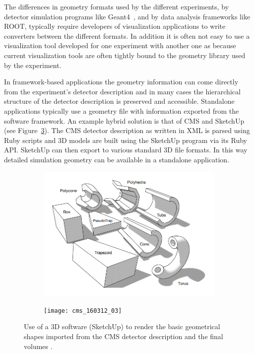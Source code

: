 \documentclass[12pt,a4paper]{article}
\begin{document}
The differences in geometry formats used by the different experiments, by detector simulation programs like Geant4~\cite{Geant4},
and by data analysis frameworks like ROOT, typically require developers of visualization applications to write converters
between the different formats. In addition it is often not easy to use a visualization tool developed for one experiment with another one as
because current visualization tools are often tightly bound to the geometry library used by the experiment.

In framework-based applications the geometry information can come directly from the experiment's detector description and in
 many cases the hierarchical structure of the detector description is preserved and accessible. Standalone applications
typically use a geometry file with information exported from the software framework. An example hybrid solution is that
of CMS and SketchUp~\cite{CMSSketchUp} (see Figure~\ref{fig:cms-sketchup}).
The CMS detector description as written in XML is parsed using Ruby scripts and 3D models are built using the
SketchUp program via its Ruby API. SketchUp can then export to various standard 3D file formats. In this way
detailed simulation geometry can be available in a standalone application.

\begin{figure}
	\centering
	\begin{subfigure}[b]{0.475\textwidth}
		\centering
		\includegraphics[width=\textwidth]{cms-sketchup-shapes}
		\caption[Converting the CMS detector geometry data to 3D meshes]{{\small}}
		\label{fig:ed-sketchup-a}
	\end{subfigure}
	\quad
	\begin{subfigure}[b]{0.475\textwidth}
		\centering
		\texttt{[image: cms\_160312\_03]}
		\caption[Rendering the CMS geometry in the SketchUp 3D software]%
		{{\small }}
		\label{fig:cms-sketchup-b}
	\end{subfigure}
	\caption[Using 3D editing software for HEP Geometry]
	{\small Use of a 3D software (SketchUp) to render the basic geometrical shapes imported from the CMS detector description and the final volumes \cite{CMSSketchUpImages}.}
	\label{fig:cms-sketchup}
\end{figure}
\end{document}
